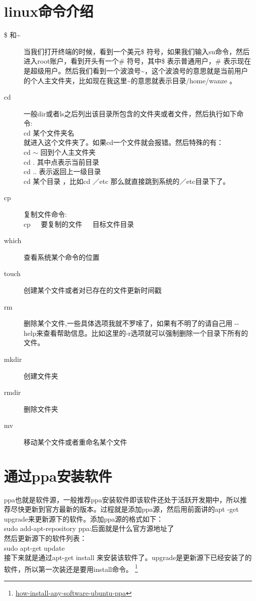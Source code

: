 \documentclass[12pt,oneside]{book}
\begin{document}
\begin{common-format}
\section{linux命令介绍}
\begin{description}
\item[ \${} 和\~{}] 当我们打开终端的时候，看到一个美元\$ 符号，如果我们输入su命令，然后进入root账户，看到开头有一个\#{} 符号，其中\$ 表示普通用户，\#{} 表示现在是超级用户。然后我们看到一个波浪号\~{}，这个波浪号的意思就是当前用户的个人主文件夹，比如现在我这里\~{}的意思就表示目录/home/wanze 。
\item[ cd] 一般dir或者ls之后列出该目录所包含的文件夹或者文件，然后执行如下命令:\\cd 某个文件夹名 \\ 就进入这个文件夹了。如果cd一个文件就会报错。然后特殊的有：\\ cd $\sim$ 回到个人主文件夹\\cd . 其中点表示当前目录\\cd .. 表示返回上一级目录\\cd 某个目录 ，比如cd ／etc 那么就直接跳到系统的／etc目录下了。
\item[ cp] 复制文件命令:\\ cp~~~要复制的文件~~~目标文件目录 
\item[ which] 查看系统某个命令的位置
\item[ touch] 创建某个文件或者对已存在的文件更新时间戳
\item[ rm ]删除某个文件,一些具体选项我就不罗嗦了，如果有不明了的请自己用 -{}- help来查看帮助信息。比如这里的-r选项就可以强制删除一个目录下所有的文件。
\item[ mkdir] 创建文件夹


\item[ rmdir] 删除文件夹
\item[ mv ]移动某个文件或者重命名某个文件
\end{description}

\section{通过ppa安装软件}
ppa也就是软件源，一般推荐ppa安装软件即该软件还处于活跃开发期中，所以推荐尽快更新到官方最新的版本。过程就是添加ppa源，然后用前面讲的apt -get upgrade来更新源下的软件。添加ppa源的格式如下：\\
sudo add-apt-repository ppa:后面就是什么官方源地址了\\
然后更新源下的软件列表：\\
sudo apt-get update\\
接下来就是通过apt-get  install 来安装该软件了。upgrade是更新源下已经安装了的软件，所以第一次装还是要用install命令。
\footnote{\href{http://linuxers.org/howto/how-install-any-software-ubuntu-ppa}{how-install-any-software-ubuntu-ppa}}


\end{common-format}
\end{document}
